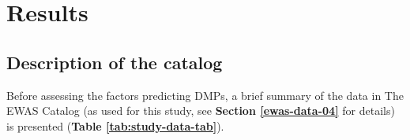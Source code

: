 \documentclass[11pt,twoside]{bristolthesis}
\begin{document}
\newpage

\hypertarget{results-04}{%
\section{Results}\label{results-04}}

\hypertarget{catalog-description}{%
\subsection*{Description of the catalog}\label{catalog-description}}

Before assessing the factors predicting DMPs, a brief summary of the data in The EWAS Catalog (as used for this study, see \textbf{Section \ref{ewas-data-04}} for details) is presented (\textbf{Table \ref{tab:study-data-tab}}).
\end{document}
